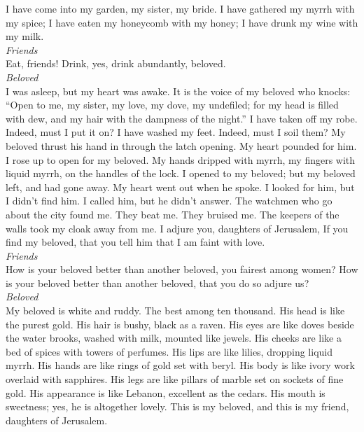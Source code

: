  I have come into my garden, my sister, my bride. I have
gathered my myrrh with my spice; I have eaten my honeycomb with my
honey; I have drunk my wine with my milk.\\
\emph{Friends}\\
Eat, friends! Drink, yes, drink abundantly, beloved.\\
\emph{Beloved}\\
 I was asleep, but my heart was awake. It is the voice of
my beloved who knocks: ``Open to me, my sister, my love, my dove, my
undefiled; for my head is filled with dew, and my hair with the dampness
of the night.''  I have taken off my robe. Indeed, must I
put it on? I have washed my feet. Indeed, must I soil them?
 My beloved thrust his hand in through the latch opening.
My heart pounded for him.  I rose up to open for my
beloved. My hands dripped with myrrh, my fingers with liquid myrrh, on
the handles of the lock.  I opened to my beloved; but my
beloved left, and had gone away. My heart went out when he spoke. I
looked for him, but I didn't find him. I called him, but he didn't
answer.  The watchmen who go about the city found me. They
beat me. They bruised me. The keepers of the walls took my cloak away
from me.  I adjure you, daughters of Jerusalem, If you
find my beloved, that you tell him that I am faint with love.\\
\emph{Friends}\\
 How is your beloved better than another beloved, you
fairest among women? How is your beloved better than another beloved,
that you do so adjure us?\\
\emph{Beloved}\\
 My beloved is white and ruddy. The best among ten
thousand.  His head is like the purest gold. His hair is
bushy, black as a raven.  His eyes are like doves beside
the water brooks, washed with milk, mounted like jewels. 
His cheeks are like a bed of spices with towers of perfumes. His lips
are like lilies, dropping liquid myrrh.  His hands are
like rings of gold set with beryl. His body is like ivory work overlaid
with sapphires.  His legs are like pillars of marble set
on sockets of fine gold. His appearance is like Lebanon, excellent as
the cedars.  His mouth is sweetness; yes, he is
altogether lovely. This is my beloved, and this is my friend, daughters
of Jerusalem.

